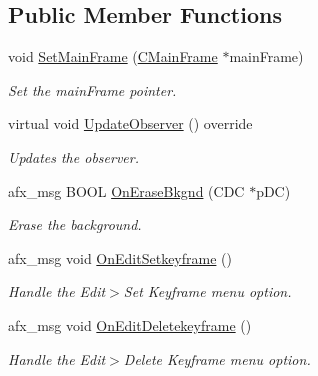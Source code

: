 \subsection*{Public Member Functions}
\begin{DoxyCompactItemize}
\item 
void \hyperlink{class_c_view_timeline_aba069993dd75712f340999345e791327}{Set\+Main\+Frame} (\hyperlink{class_c_main_frame}{C\+Main\+Frame} $\ast$main\+Frame)
\begin{DoxyCompactList}\small\item\em Set the main\+Frame pointer. \end{DoxyCompactList}\item 
virtual void \hyperlink{class_c_view_timeline_a21388abd4726fd3dbe02b6e2ea313369}{Update\+Observer} () override
\begin{DoxyCompactList}\small\item\em Updates the observer. \end{DoxyCompactList}\item 
afx\+\_\+msg B\+O\+O\+L \hyperlink{class_c_view_timeline_a8328ae76e5f95d36b3ab7e8bbd8ef72f}{On\+Erase\+Bkgnd} (C\+D\+C $\ast$p\+D\+C)
\begin{DoxyCompactList}\small\item\em Erase the background. \end{DoxyCompactList}\item 
\hypertarget{class_c_view_timeline_acb22f2662a21152e607d17dbc293351c}{afx\+\_\+msg void \hyperlink{class_c_view_timeline_acb22f2662a21152e607d17dbc293351c}{On\+Edit\+Setkeyframe} ()}\label{class_c_view_timeline_acb22f2662a21152e607d17dbc293351c}

\begin{DoxyCompactList}\small\item\em Handle the Edit$>$Set Keyframe menu option. \end{DoxyCompactList}\item 
\hypertarget{class_c_view_timeline_ab3eccb4a5bcd5ffa60442359b86e0597}{afx\+\_\+msg void \hyperlink{class_c_view_timeline_ab3eccb4a5bcd5ffa60442359b86e0597}{On\+Edit\+Deletekeyframe} ()}\label{class_c_view_timeline_ab3eccb4a5bcd5ffa60442359b86e0597}

\begin{DoxyCompactList}\small\item\em Handle the Edit$>$Delete Keyframe menu option. \end{DoxyCompactList}\end{DoxyCompactItemize}
